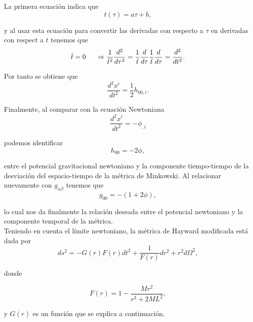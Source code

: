\documentclass{article}
\numberwithin{equation}{section}
\theoremstyle{definition}
\begin{document}
La primera ecuación indica que 
\begin{equation*}
t(\tau) = a\tau + b,
\end{equation*}

y al usar esta ecuación para convertir las derivadas con respecto a $\tau$ en derivadas con respect a $t$ tenemos que 	
\begin{equation*}
\ddot{t} = 0 \hspace{.5cm} \Rightarrow \frac{1}{\dot{t}^2}\frac{d^2}{d\tau^2} = \frac{1}{\dot{t}}\frac{d}{d\tau}\frac{1}{\dot{t}}\frac{d}{d\tau} = \frac{d^2}{dt^2}.
\end{equation*}

Por tanto se obtiene que 
\begin{equation*}
\frac{d^2x^i}{dt^2} = \frac{1}{2}h_{00,i}.
\end{equation*}

Finalmente, al comparar con la ecuación Newtoniana 
\begin{equation*}
\frac{d^2x^i}{dt^2} = -\phi_{,i}
\end{equation*}

podemos identificar 
\begin{equation*}
h_{00} = -2\phi,
\end{equation*}

entre el potencial gravitacional newtoniano y la componente tiempo-tiempo de la desviación del espacio-tiempo de la métrica de Minkowski. Al relacionar nuevamente con $g_{\alpha \beta}$ tenemos que 
\begin{equation}
\label{newton - metric}
g_{00} = - (1 + 2\phi),
\end{equation}

lo cual nos da finalmente la relación deseada entre el potencial newtoniano y la componente temporal de la métrica.\\

Teniendo en cuenta el límite newtoniano, la métrica de Hayward modificada está dada por 
\begin{equation}
\label{reg-schF}
ds^2 = -G(r)F(r) dt^2 + \frac{1}{F(r)} dr^2 + r^2d\Omega^2,
\end{equation}

donde

\begin{equation}
\label{mod-hay-f}
F(r) = 1 - \frac{Mr^2}{r^3 + 2ML^2},
\end{equation}

y $G(r)$ es un función que se explica a continuación.\\
\end{document}
